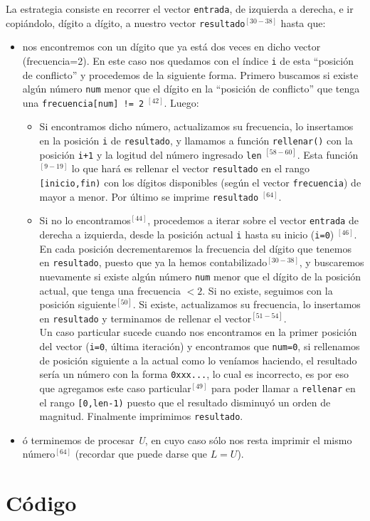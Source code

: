 \documentclass[10pt,a4paper,oneside]{article}
\begin{document}
La estrategia consiste en recorrer el vector \texttt{entrada}, de izquierda a derecha, e ir copi\'andolo, d\'igito a d\'igito, a nuestro vector \texttt{resultado}$^{[30-38]}$ hasta que:
\begin{itemize}
    
    \item nos encontremos con un d\'igito que ya est\'a dos veces en dicho vector (frecuencia=2). En este caso nos quedamos con el \'indice \texttt{i} de esta ``posici\'on de conflicto'' y procedemos de la siguiente forma. Primero buscamos si existe alg\'un n\'umero \texttt{num} menor que el d\'igito en la ``posici\'on de conflicto'' que tenga una \texttt{frecuencia[num] != 2} $^{[42]}$. Luego: 
    \begin{itemize}
        \item Si encontramos dicho n\'umero, actualizamos su frecuencia, lo insertamos en la posici\'on \texttt{i} de \texttt{resultado}, y llamamos a funci\'on \texttt{rellenar()} con la posici\'on \texttt{i+1} y la logitud del n\'umero ingresado \texttt{len} $^{[58-60]}$. Esta funci\'on$^{[9-19]}$ lo que har\'a es rellenar el vector \texttt{resultado} en el rango \texttt{[inicio,fin)} con los d\'igitos disponibles (seg\'un el vector \texttt{frecuencia}) de mayor a menor. Por \'ultimo se imprime \texttt{resultado} $^{[64]}$.
        \item Si no lo encontramos$^{[44]}$, procedemos a iterar sobre el vector \texttt{entrada} de derecha a izquierda, desde la posici\'on actual \texttt{i} hasta su inicio (\texttt{i=0}) $^{[46]}$. En cada posici\'on decrementaremos la frecuencia del d\'igito que tenemos en \texttt{resultado}, puesto que ya la hemos contabilizado$^{[30-38]}$, y buscaremos nuevamente si existe alg\'un n\'umero \texttt{num} menor que el d\'igito de la posici\'on actual, que tenga una frecuencia $< 2$. Si no existe, seguimos con la posici\'on siguiente$^{[50]}$. Si existe, actualizamos su frecuencia, lo insertamos en \texttt{resultado} y terminamos de rellenar el vector$^{[51-54]}$.\\
        Un caso particular sucede cuando nos encontramos en la primer posici\'on del vector (\texttt{i=0}, \'ultima iteraci\'on) y encontramos que \texttt{num=0}, si rellenamos de posici\'on siguiente a la actual como lo ven\'iamos haciendo, el resultado sería un n\'umero con la forma \texttt{0xxx...}, lo cual es incorrecto, es por eso que agregamos este caso particular$^{[49]}$ para poder llamar a \texttt{rellenar} en el rango \texttt{[0,len-1)} puesto que el resultado disminuy\'o un orden de magnitud. Finalmente imprimimos \texttt{resultado}.
    \end{itemize}
    \item \'o terminemos de procesar \textit{U}, en cuyo caso s\'olo nos resta imprimir el mismo n\'umero$^{[64]}$ (recordar que puede darse que $L = U$).
\end{itemize}

%
\pagebreak
\section*{C\'odigo}

\end{document}

